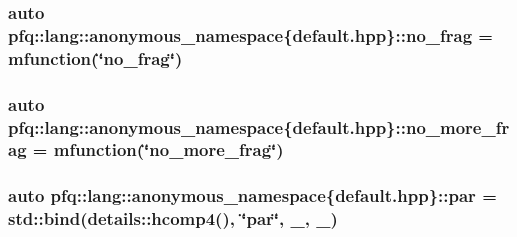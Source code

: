 \hypertarget{namespacepfq_1_1lang_1_1anonymous__namespace_02default_8hpp_03_a4cfaf018f687a1563161b8f4245a6652}{
\subsubsection[{no\+\_\+frag}]{\setlength{\rightskip}{0pt plus 5cm}auto pfq\+::lang\+::anonymous\+\_\+namespace\{default.\+hpp\}\+::no\+\_\+frag = {\bf mfunction}(\char`\"{}no\+\_\+frag\char`\"{})}}\label{namespacepfq_1_1lang_1_1anonymous__namespace_02default_8hpp_03_a4cfaf018f687a1563161b8f4245a6652}
\hypertarget{namespacepfq_1_1lang_1_1anonymous__namespace_02default_8hpp_03_a88628ce70e2a650af1338851373b9891}{
\subsubsection[{no\+\_\+more\+\_\+frag}]{\setlength{\rightskip}{0pt plus 5cm}auto pfq\+::lang\+::anonymous\+\_\+namespace\{default.\+hpp\}\+::no\+\_\+more\+\_\+frag = {\bf mfunction}(\char`\"{}no\+\_\+more\+\_\+frag\char`\"{})}}\label{namespacepfq_1_1lang_1_1anonymous__namespace_02default_8hpp_03_a88628ce70e2a650af1338851373b9891}
\hypertarget{namespacepfq_1_1lang_1_1anonymous__namespace_02default_8hpp_03_abd0f7876a26a959f9fc211cc23599493}{
\subsubsection[{par}]{\setlength{\rightskip}{0pt plus 5cm}auto pfq\+::lang\+::anonymous\+\_\+namespace\{default.\+hpp\}\+::par = std\+::bind(details\+::hcomp4(), \char`\"{}par\char`\"{}, \+\_, \+\_)}}\label{namespacepfq_1_1lang_1_1anonymous__namespace_02default_8hpp_03_abd0f7876a26a959f9fc211cc23599493}
